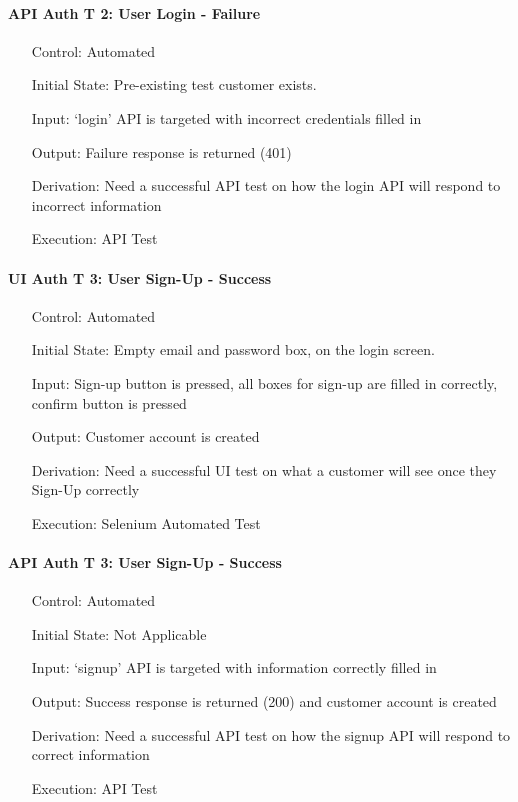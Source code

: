 \documentclass[12pt, titlepage]{article}
\begin{document}
\paragraph*{API Auth T 2: User Login - Failure}
\begin{itemize}
	\item[Control:] Automated
	\item[Initial State:] Pre-existing test customer exists. 
	\item[Input:] `login' API is targeted with incorrect credentials filled in
	\item[Output:] Failure response is returned (401)
	\item[Derivation:] Need a successful API test on how the login API will respond to incorrect information
	\item[Execution:] API Test
\end{itemize}

\paragraph*{UI Auth T 3: User Sign-Up - Success}
\begin{itemize}
	\item[Control:] Automated
	\item[Initial State:] Empty email and password box, on the login screen.
	\item[Input:] Sign-up button is pressed, all boxes for sign-up are filled in correctly, confirm button is pressed
	\item[Output:] Customer account is created
	\item[Derivation:] Need a successful UI test on what a customer will see once they Sign-Up correctly
	\item[Execution:] Selenium Automated Test
\end{itemize}

\paragraph*{API Auth T 3: User Sign-Up - Success}
\begin{itemize}
	\item[Control:] Automated
	\item[Initial State:] Not Applicable
	\item[Input:] `signup' API is targeted with information correctly filled in
	\item[Output:] Success response is returned (200) and customer account is created
	\item[Derivation:] Need a successful API test on how the signup API will respond to correct information
	\item[Execution:] API Test
\end{itemize}
\end{document}
